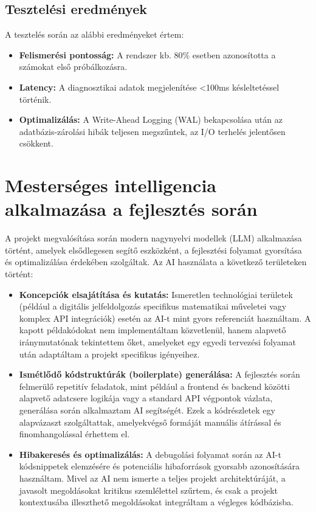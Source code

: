 \documentclass[12pt,a4paper,hungarian]{report}
\begin{document}
\subsection{Tesztelési eredmények}
A tesztelés során az alábbi eredményeket értem:
\begin{itemize}
    \item \textbf{Felismerési pontosság:} A rendszer kb. 80\% esetben azonosította a számokat első próbálkozásra.
    \item \textbf{Latency:} A diagnosztikai adatok megjelenítése <100ms késleltetéssel történik.
    \item \textbf{Optimalizálás:} A Write-Ahead Logging (WAL) bekapcsolása után az adatbázis-zárolási hibák teljesen megszűntek, az I/O terhelés jelentősen csökkent.
\end{itemize}

\section{Mesterséges intelligencia alkalmazása a fejlesztés során}
A projekt megvalósítása során modern nagynyelvi modellek (LLM) alkalmazása történt, amelyek elsődlegesen segítő eszközként, a fejlesztési folyamat gyorsítása és optimalizálása érdekében szolgáltak. Az AI használata a következő területeken történt:

\begin{itemize}
    \item \textbf{Koncepciók elsajátítása és kutatás:} Ismeretlen technológiai területek (például a digitális jelfeldolgozás specifikus matematikai műveletei vagy komplex API integrációk) esetén az AI-t mint gyors referenciát használtam. A kapott példakódokat nem implementáltam közvetlenül, hanem alapvető iránymutatónak tekintettem őket, amelyeket egy egyedi tervezési folyamat után adaptáltam a projekt specifikus igényeihez.
    \item \textbf{Ismétlődő kódstruktúrák (boilerplate) generálása:} A fejlesztés során felmerülő repetitív feladatok, mint például a frontend és backend közötti alapvető adatcsere logikája vagy a standard API végpontok vázlata, generálása során alkalmaztam AI segítségét. Ezek a kódrészletek egy alapvázaszt szolgáltattak, amelyekvégső formáját manuális átírással és finomhangolással érhettem el.
    \item \textbf{Hibakeresés és optimalizálás:} A debugolási folyamat során az AI-t kódsnippetek elemzésére és potenciális hibaforrások gyorsabb azonosítására használtam. Mivel az AI nem ismerte a teljes projekt architektúráját, a javasolt megoldásokat kritikus szemlélettel szűrtem, és csak a projekt kontextusába illeszthető megoldásokat integráltam a végleges kódbázisba.
\end{itemize}
\end{document}
